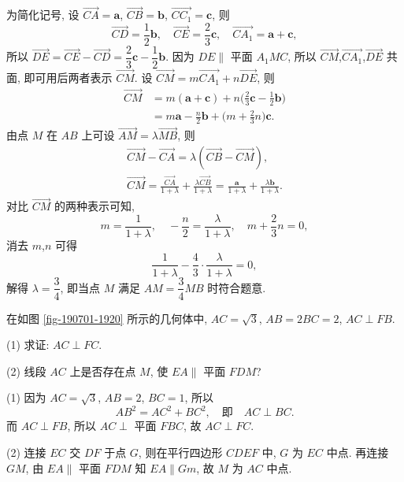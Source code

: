     为简化记号, 设 $\overrightarrow{CA}= \bm{a}$, $\overrightarrow{CB}= \bm{b}$, $\overrightarrow{CC_1}= \bm{c}$, 则 
    \[\overrightarrow{CD}= \frac12\bm{b},\quad
    \overrightarrow{CE}= \frac23\bm{c},\quad
    \overrightarrow{CA_1}= \bm{a}+ \bm{c},\]
    所以 $\overrightarrow{DE}= \overrightarrow{CE}- \overrightarrow{CD}= \dfrac23\bm{c}- \dfrac12\bm{b}$. 因为 $DE\parallel$ 平面 $A_1MC$, 所以 $\overrightarrow{CM}$,$\overrightarrow{CA_1}$,$\overrightarrow{DE}$ 共面, 即可用后两者表示 $\overrightarrow{CM}$. 设 $\overrightarrow{CM}= m\overrightarrow{CA_1}+ n\overrightarrow{DE}$, 则
    \[\begin{aligned}
        \overrightarrow{CM}
        &= m(\bm{a}+\bm{c})+ n\biggl(\frac23\bm{c}- \frac12\bm{b}\biggr)\\
        &= m\bm{a} - \frac{n}2\bm{b}+ \biggl(m+\frac23n\biggr)\bm{c}.
    \end{aligned}\]
    由点 $M$ 在 $AB$ 上可设 $\overrightarrow{AM}= \lambda\overrightarrow{MB}$, 则
    \[\begin{gathered}
        \overrightarrow{CM}- \overrightarrow{CA}
        = \lambda(\overrightarrow{CB}- \overrightarrow{CM}),\\
        \overrightarrow{CM}
        = \frac{\overrightarrow{CA}}{1+\lambda}
            + \frac{\lambda\overrightarrow{CB}}{1+\lambda}
        = \frac{\bm{a}}{1+\lambda}
            + \frac{\lambda\bm{b}}{1+\lambda}.
    \end{gathered}\]
    对比 $\overrightarrow{CM}$ 的两种表示可知,
    \[m= \frac1{1+\lambda},\quad
    -\frac{n}2= \frac{\lambda}{1+\lambda},\quad
    m+\frac23n= 0,\]
    消去 $m$,$n$ 可得
    \[\frac1{1+\lambda}- \frac43\cdot \frac{\lambda}{1+\lambda}=0,\]
    解得 $\lambda= \dfrac34$, 即当点 $M$ 满足 $AM= \dfrac34 MB$ 时符合题意.
\endsolution 
    
\lianxi
\begin{exercise}[s]
    在如图 \ref{fig-190701-1920} 所示的几何体中, $AC= \sqrt3$, $AB=2BC=2$, $AC\perp FB$.
    
    (1) 求证: $AC\perp FC$.
    
    (2) 线段 $AC$ 上是否存在点 $M$, 使 $EA\parallel$ 平面 $FDM$?
\end{exercise}
\beginsolution
    (1) 因为 $AC=\sqrt3$, $AB=2$, $BC=1$, 所以
    \[AB^2= AC^2+ BC^2,\quad\text{即}\quad AC\perp BC.\]
    而 $AC\perp FB$, 所以 $AC\perp$ 平面 $FBC$, 故 $AC\perp FC$.

    (2) 连接 $EC$ 交 $DF$ 于点 $G$, 则在平行四边形 $CDEF$ 中, $G$ 为 $EC$ 中点. 再连接 $GM$, 由 $EA\parallel$ 平面 $FDM$ 知 $EA\parallel Gm$, 故 $M$ 为 $AC$ 中点.
\endsolution

